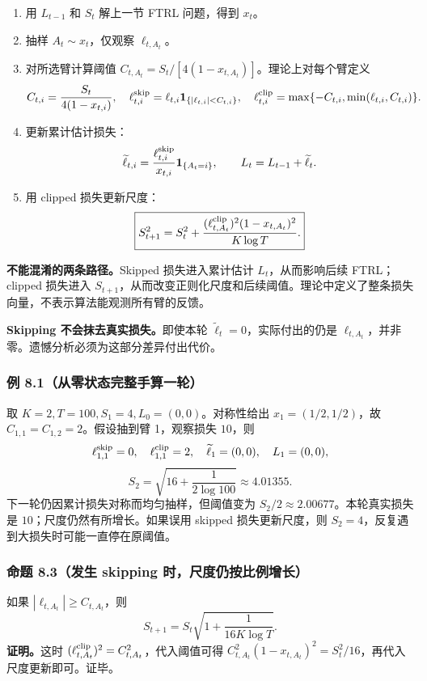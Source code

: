 \begin{enumerate}
\item 用 $L_{t-1}$ 和 $S_t$ 解上一节 FTRL 问题，得到 $x_t$。
\item 抽样 $A_t\sim x_t$，仅观察 $\ell_{t,A_t}$。
\item 对所选臂计算阈值 $C_{t,A_t}=S_t/[4(1-x_{t,A_t})]$。理论上对每个臂定义
\[
C_{t,i}=\frac{S_t}{4(1-x_{t,i})},\quad
\ell^{\rm skip}_{t,i}=\ell_{t,i}\mathbf1_{\{|\ell_{t,i}|<C_{t,i}\}},\quad
\ell^{\rm clip}_{t,i}=\max\{-C_{t,i},\min(\ell_{t,i},C_{t,i})\}.
\]
\item 更新累计估计损失：
\[
\widetilde\ell_{t,i}=\frac{\ell^{\rm skip}_{t,i}}{x_{t,i}}\mathbf1_{\{A_t=i\}},\qquad
L_t=L_{t-1}+\widetilde\ell_t.
\]
\item 用 clipped 损失更新尺度：
\[
\boxed{S_{t+1}^2=S_t^2+
\frac{(\ell^{\rm clip}_{t,A_t})^2(1-x_{t,A_t})^2}{K\log T}.}
\]
\end{enumerate}

\textbf{不能混淆的两条路径。}Skipped 损失进入累计估计 $L_t$，从而影响后续 FTRL；clipped 损失进入 $S_{t+1}$，从而改变正则化尺度和后续阈值。理论中定义了整条损失向量，不表示算法能观测所有臂的反馈。

\textbf{Skipping 不会抹去真实损失。}即使本轮 $\widetilde\ell_t=0$，实际付出的仍是 $\ell_{t,A_t}$，并非零。遗憾分析必须为这部分差异付出代价。

\subsubsection{例 8.1（从零状态完整手算一轮）}
取 $K=2,T=100,S_1=4,L_0=(0,0)$。对称性给出 $x_1=(1/2,1/2)$，故 $C_{1,1}=C_{1,2}=2$。假设抽到臂 1，观察损失 $10$，则
\[
\ell^{\rm skip}_{1,1}=0,\quad \ell^{\rm clip}_{1,1}=2,\quad
\widetilde\ell_1=(0,0),\quad L_1=(0,0),
\]
\[
S_2=\sqrt{16+\frac{1}{2\log100}}\approx4.01355.
\]
下一轮仍因累计损失对称而均匀抽样，但阈值变为 $S_2/2\approx2.00677$。本轮真实损失是 $10$；尺度仍然有所增长。如果误用 skipped 损失更新尺度，则 $S_2=4$，反复遇到大损失时可能一直停在原阈值。

\subsubsection{命题 8.3（发生 skipping 时，尺度仍按比例增长）}
如果 $|\ell_{t,A_t}|\ge C_{t,A_t}$，则
\[
S_{t+1}=S_t\sqrt{1+\frac{1}{16K\log T}}.
\]
\textbf{证明。}这时 $(\ell^{\rm clip}_{t,A_t})^2=C_{t,A_t}^2$，代入阈值可得
$C_{t,A_t}^2(1-x_{t,A_t})^2=S_t^2/16$，再代入尺度更新即可。证毕。

